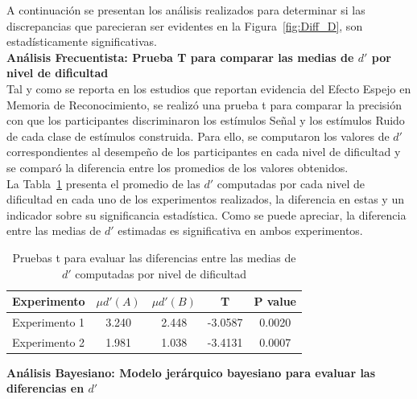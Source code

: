 A continuación se presentan los análisis realizados para determinar si las discrepancias que parecieran ser evidentes en la Figura~\ref{fig:Diff_D}, son estadísticamente significativas.\\

\textbf{Análisis Frecuentista: Prueba T para comparar las medias de $d'$ por nivel de dificultad}\\

Tal y como se reporta en los estudios que reportan evidencia del Efecto Espejo en Memoria de Reconocimiento, se realizó una prueba t para comparar la precisión con que los participantes discriminaron los estímulos Señal y los estímulos Ruido de cada clase de estímulos construida. Para ello, se computaron los valores de $d'$ correspondientes al desempeño de los participantes en cada nivel de dificultad y se comparó la diferencia entre los promedios de los valores obtenidos.\\

La Tabla~\ref{Tabla_t-Dprimas} presenta el promedio de las $d'$ computadas por cada nivel de dificultad en cada uno de los experimentos realizados, la diferencia en estas y un indicador sobre su significancia estadística. Como se puede apreciar, la diferencia entre las medias de $d'$ estimadas es significativa en ambos experimentos.\\

\begin{table}
\caption[Prueba T para evaluar las diferencias entre las medias de $d'$ por nivel de dificultad]{Pruebas t para evaluar las diferencias entre las medias de $d'$ computadas por nivel de dificultad}
\label{Tabla_t-Dprimas}
\centering
\begin{tabular}{l | c c c c}
\toprule
\textbf{Experimento} & \textbf{$\mu d'(A)$} & \textbf{$\mu d'(B)$} & \textbf{T}  & \textbf{P value}\\
\midrule
Experimento 1 & 3.240 & 2.448 & -3.0587 & 0.0020 \\
Experimento 2 & 1.981 & 1.038 & -3.4131 & 0.0007 \\
\bottomrule
\end{tabular}
\end{table}


\textbf{Análisis Bayesiano: Modelo jerárquico bayesiano para evaluar las diferencias en $d'$}\\

